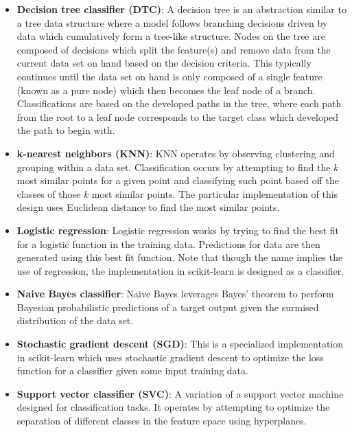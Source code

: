 \documentclass[10pt,sigconf,letterpaper,nonacm]{acmart}
\begin{document}
\begin{itemize}
  \item \textbf{Decision tree classifier (DTC)}: A decision tree is an abstraction similar to a tree data structure where a model follows branching decisions driven by data which cumulatively form a tree-like structure.
  Nodes on the tree are composed of decisions which split the feature(s) and remove data from the current data set on hand based on the decision criteria.
  This typically continues until the data set on hand is only composed of a single feature (known as a pure node) which then becomes the leaf node of a branch.
  Classifications are based on the developed paths in the tree, where each path from the root to a leaf node corresponds to the target class which developed the path to begin with.
  
  \item \textbf{k-nearest neighbors (KNN)}: KNN operates by observing clustering and grouping within a data set.
  Classification occurs by attempting to find the $k$ most similar points for a given point and classifying such point based off the classes of those $k$ most similar points.
  The particular implementation of this design uses Euclidean distance to find the most similar points.
  
  \item \textbf{Logistic regression}: Logistic regression works by trying to find the best fit for a logistic function in the training data.
  Predictions for data are then generated using this best fit function.
  Note that though the name implies the use of regression, the implementation in scikit-learn is designed as a classifier.
  
  \item \textbf{Naive Bayes classifier}: Naive Bayes leverages Bayes' theorem to perform Bayesian probabilistic predictions of a target output given the surmised distribution of the data set.
  
  \item \textbf{Stochastic gradient descent (SGD)}: This is a specialized implementation in scikit-learn which uses stochastic gradient descent to optimize the loss function for a classifier given some input training data. 
  
  \item \textbf{Support vector classifier (SVC)}: A variation of a support vector machine designed for classification tasks. It operates by attempting to optimize the separation of different classes in the feature space using hyperplanes.
\end{itemize}
\end{document}
